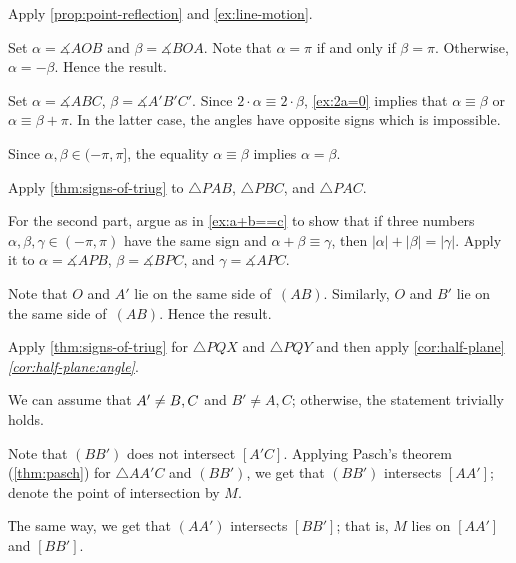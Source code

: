  Apply \ref{prop:point-reflection} and \ref{ex:line-motion}.

\setcounter{eqtn}{0}

Set $\alpha=\measuredangle AOB$ 
and 
$\beta=\measuredangle BOA$.
Note that $\alpha=\pi$ if and only if $\beta=\pi$.
Otherwise, $\alpha=-\beta$.
Hence the result.

Set $\alpha=\measuredangle ABC$, $\beta=\measuredangle A'B'C'$.
Since $2\cdot\alpha\equiv 2\cdot \beta$, \ref{ex:2a=0} implies that
 $\alpha\equiv \beta$ or $\alpha\equiv \beta+\pi$.
In the latter case, the angles have opposite signs which is impossible.

Since $\alpha,\beta\in(-\pi,\pi]$, the equality $\alpha\equiv \beta$ implies $\alpha= \beta$.

Apply \ref{thm:signs-of-triug} to $\triangle PAB$, $\triangle PBC$, and $\triangle PAC$.

For the second part, argue as in \ref{ex:a+b==c} to show that if three numbers $\alpha,\beta,\gamma\in (-\pi,\pi)$ have the same sign and
$\alpha+\beta\equiv\gamma$, then
$|\alpha|+|\beta|=|\gamma|$.
Apply it to $\alpha=\measuredangle APB$,
$\beta=\measuredangle BPC$,
and
$\gamma=\measuredangle APC$.





Note that $O$ and $A'$
lie on the same side of~$(AB)$.
Similarly, $O$ and $B'$
lie on the same side of~$(AB)$.
Hence the result.

Apply \ref{thm:signs-of-triug} for $\triangle PQX$ and $\triangle PQY$ and then 
apply \ref{cor:half-plane}\textit{\ref{cor:half-plane:angle}}.

We can assume that $A'\ne B,C$ and $B'\ne A, C$;
otherwise, the statement trivially holds.

Note that $(BB')$ does not intersect $[A'C]$.
Applying Pasch's theorem (\ref{thm:pasch}) for $\triangle AA'C$ and $(BB')$, we get that 
$(BB')$ intersects $[AA']$; denote the point of intersection by $M$.

Тhe same way, we get that $(AA')$ intersects $[BB']$;
that is, $M$ lies on $[AA']$ and $[BB']$.

